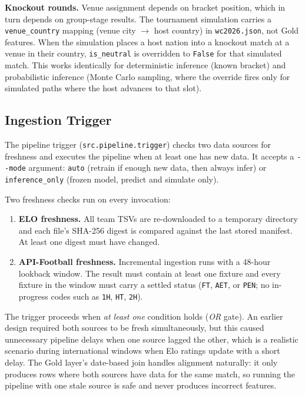 \documentclass[conference]{IEEEtran}
\begin{document}
\textbf{Knockout rounds.}  Venue assignment depends on bracket position, which in turn
depends on group-stage results.  The tournament simulation carries a
\texttt{venue\_country} mapping (venue city $\to$ host country) in
\texttt{wc2026.json}, not Gold features.  When the simulation places a host nation into a
knockout match at a venue in their country, \texttt{is\_neutral} is overridden to
\texttt{False} for that simulated match.  This works identically for deterministic
inference (known bracket) and probabilistic inference (Monte Carlo sampling, where the
override fires only for simulated paths where the host advances to that slot).

\subsection{Ingestion Trigger}

The pipeline trigger (\texttt{src.pipeline.trigger}) checks two data sources
for freshness and executes the pipeline when at least one has new data.
It accepts a \texttt{-{}-mode} argument: \texttt{auto} (retrain if enough new
data, then always infer) or \texttt{inference\_only} (frozen model, predict
and simulate only).

Two freshness checks run on every invocation:

\begin{enumerate}
  \item \textbf{ELO freshness.} All team TSVs are re-downloaded to a temporary
  directory and each file's SHA-256 digest is compared against the last stored
  manifest. At least one digest must have changed.
  \item \textbf{API-Football freshness.} Incremental ingestion runs with a
  48-hour lookback window. The result must contain at least one fixture and
  every fixture in the window must carry a settled status
  (\texttt{FT}, \texttt{AET}, or \texttt{PEN}; no in-progress codes such
  as \texttt{1H}, \texttt{HT}, \texttt{2H}).
\end{enumerate}

The trigger proceeds when \emph{at least one} condition holds (\emph{OR} gate).
An earlier design required both sources to be fresh simultaneously, but this
caused unnecessary pipeline delays when one source lagged the other, which is a
realistic scenario during international windows when Elo ratings update with
a short delay. The Gold layer's date-based join handles alignment naturally:
it only produces rows where both sources have data for the same match,
so running the pipeline with one stale source is safe and never produces
incorrect features.
\end{document}
